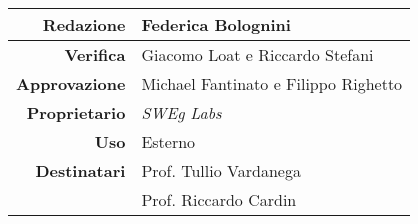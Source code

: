 \thispagestyle{empty} %

\begin{center}
    \begin{tabular}{r|l}
        \textbf{Redazione} & Federica Bolognini \\
        \hline
        \textbf{Verifica} & Giacomo Loat e Riccardo Stefani \\
        \hline
        \textbf{Approvazione} & Michael Fantinato e Filippo Righetto \\
        \hline
        \textbf{Proprietario} & \emph{SWEg Labs} \\
        \hline
        \textbf{Uso} & Esterno \\
        \hline
        \textbf{Destinatari} & Prof. Tullio Vardanega \\
                             & Prof. Riccardo Cardin \\
    \end{tabular}
\end{center}
    






